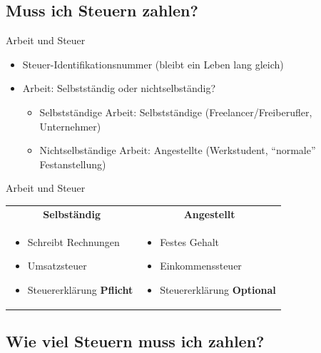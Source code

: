 \documentclass{beamer}
\begin{document}
		\begin{frame}
		\end{frame}
	
		\subsection{Muss ich Steuern zahlen?}
		
			\begin{frame}{Arbeit und Steuer}
				\begin{itemize}
					\item Steuer-Identifikationsnummer (bleibt ein Leben lang gleich)
					\item Arbeit: Selbstständig oder nichtselbständig?
					\begin{itemize}
						\item Selbstständige Arbeit: Selbstständige (Freelancer/Freiberufler, Unternehmer)
						\item Nichtselbständige Arbeit: Angestellte (Werkstudent, "`normale"' Festanstellung)
					\end{itemize}
				\end{itemize}
			\end{frame}
		
			\begin{frame}{Arbeit und Steuer}
				\begin{tabularx}{\linewidth}{X|X}
					\multicolumn{1}{c|}{\textbf{Selbständig}} &
					\multicolumn{1}{c}{\textbf{Angestellt}} \\[0.25cm]
					\begin{itemize}
						\item Schreibt Rechnungen
						\item Umsatzsteuer
						\item Steuererklärung \textbf{Pflicht}
					\end{itemize} &
					\begin{itemize}
						\item Festes Gehalt
						\item Einkommenssteuer
						\item Steuererklärung \textbf{Optional}
					\end{itemize}
				\end{tabularx}
			\end{frame}
		
		\subsection{Wie viel Steuern muss ich zahlen?}
		
\end{document}
